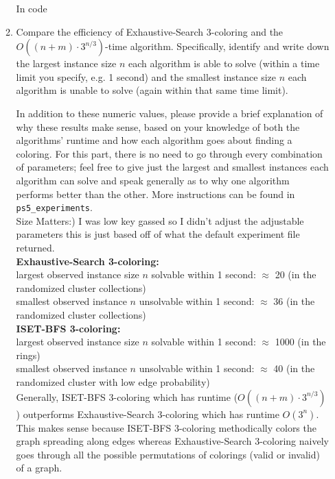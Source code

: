 \documentclass[11pt]{article}
\begin{document}
\begin{enumerate}
\begin{enumerate}
      In code \\
    
    \item Compare the efficiency of Exhaustive-Search 3-coloring and the $O((n+m)\cdot 3^{n/3})$-time algorithm. Specifically, identify and write down the largest instance size $n$ each algorithm is able to solve (within a time limit you specify, e.g. 1 second) and the smallest instance size $n$ each algorithm is unable to solve (again within that same time limit). 
    
    In addition to these numeric values, please provide a brief explanation of why these results make sense, based on your knowledge of both the algorithms' runtime and how each algorithm goes about finding a coloring. For this part, there is no need to go through every combination of parameters; feel free to give just the largest and smallest instances each algorithm can solve and speak generally as to why one algorithm performs better than the other. More instructions can be found in \texttt{ps5\_experiments}. \\

    Size Matters:) I was low key gassed so I didn't adjust the adjustable parameters this is just based off of what the default experiment file returned. \\

    \textbf{Exhaustive-Search 3-coloring:} \\
    
    largest observed instance size $n$ solvable within 1 second: $\approx$ 20 (in the randomized cluster collections) \\
    smallest observed instance $n$ unsolvable within 1 second: $\approx$ 36 (in the randomized cluster collections) \\

    \textbf{ISET-BFS 3-coloring:} \\

    largest observed instance size $n$ solvable within 1 second: $\approx$ 1000 (in the rings) \\
    smallest observed instance $n$ unsolvable within 1 second: $\approx$ 40 (in the randomized cluster with low edge probability) \\

    Generally, ISET-BFS 3-coloring which has runtime ($O((n+m)\cdot 3^{n/3})$) outperforms Exhaustive-Search 3-coloring which has runtime $O(3^n)$. This makes sense because ISET-BFS 3-coloring methodically colors the graph spreading along edges whereas Exhaustive-Search 3-coloring naively goes through all the possible permutations of colorings (valid or invalid) of a graph. \\


\end{enumerate}
\end{enumerate}
\end{document}
